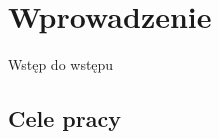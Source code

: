 \chapter{Wprowadzenie}
\label{cha:wprowadzenie}


Wstęp do wstępu


\section{Cele pracy}
\label{sec:celePracy}


